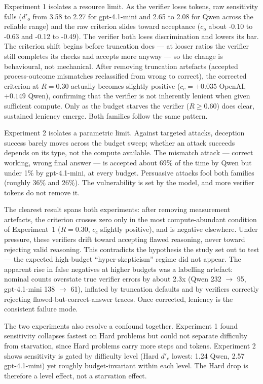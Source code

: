 \documentclass[12pt, a4paper, oneside]{report}
\begin{document}
Experiment 1 isolates a resource limit. As the verifier loses tokens, raw sensitivity falls 
($d'_o$ from 3.58 to 2.27 for gpt-4.1-mini and 2.65 to 2.08 for Qwen across the reliable range) 
and the raw criterion slides toward acceptance ($c_o$ about -0.10 to -0.63 and -0.12 to -0.49). The verifier
 both loses discrimination and lowers its bar. The criterion shift begins before truncation does ---
  at looser ratios the verifier still completes its checks and accepts more anyway --- so the change
   is behavioural, not mechanical. After removing truncation artefacts (accepted process-outcome
   mismatches reclassified from wrong to correct), the corrected criterion at $R=0.30$ actually becomes
   slightly positive ($c_c = +0.035$ OpenAI, $+0.149$ Qwen), confirming that the verifier is
   not inherently lenient when given sufficient compute. Only as the budget starves the verifier
   ($R \ge 0.60$) does clear, sustained leniency emerge. Both families follow the same pattern.

Experiment 2 isolates a parametric limit. Against targeted attacks, deception success barely moves 
across the budget sweep; whether an attack succeeds depends on its type, not the compute available. 
The mismatch attack --- correct working, wrong final answer --- is accepted about 69\% of the time by 
Qwen but under 1\% by gpt-4.1-mini, at every budget. Persuasive attacks fool both families (roughly 36\% and 26\%).
 The vulnerability is set by the model, and more verifier tokens do not remove it.

The clearest result spans both experiments: after removing measurement artefacts, the
 criterion crosses zero only in the most compute-abundant condition of Experiment~1
 ($R=0.30$, $c_c$ slightly positive), and is negative elsewhere. Under pressure, these
 verifiers drift toward accepting flawed reasoning, never toward rejecting valid reasoning.
   This contradicts the hypothesis the study set out to test --- the expected high-budget ``hyper-skepticism''
    regime did not appear. The apparent rise in false negatives at higher budgets was a labelling artefact:
    nominal counts overstate true verifier errors by about 2.3x (Qwen 232 $\rightarrow$ 95, gpt-4.1-mini 138 $\rightarrow$ 61),
     inflated by truncation defaults and by verifiers correctly rejecting flawed-but-correct-answer traces. 
     Once corrected, leniency is the consistent failure mode.

The two experiments also resolve a confound together. Experiment 1 found sensitivity collapses fastest on 
Hard problems but could not separate difficulty from starvation, since Hard problems carry more steps and tokens.
 Experiment 2 shows sensitivity is gated by difficulty level (Hard $d'_c$ lowest: 1.24 Qwen, 2.57 gpt-4.1-mini) yet
  roughly budget-invariant within each level. The Hard drop is therefore a level effect, not a starvation effect.
\end{document}
